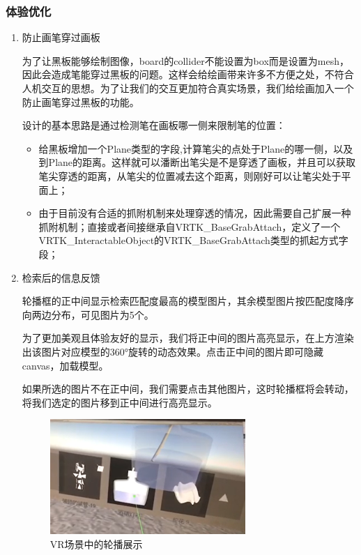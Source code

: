\documentclass{article}
\begin{document}
\subsubsection{体验优化}
\begin{enumerate}
    \item 防止画笔穿过画板
    
    \qquad 为了让黑板能够绘制图像，board的collider不能设置为box而是设置为mesh，因此会造成笔能穿过黑板的问题。这样会给绘画带来许多不方便之处，不符合人机交互的思想。为了让我们的交互更加符合真实场景，我们给绘画加入一个防止画笔穿过黑板的功能。
    
    \qquad 设计的基本思路是通过检测笔在画板哪一侧来限制笔的位置：
    \begin{itemize}
        \item 给黑板增加一个Plane类型的字段,计算笔尖的点处于Plane的哪一侧，以及到Plane的距离。这样就可以潘断出笔尖是不是穿透了画板，并且可以获取笔尖穿透的距离，从笔尖的位置减去这个距离，则刚好可以让笔尖处于平面上；
        \item 由于目前没有合适的抓附机制来处理穿透的情况，因此需要自己扩展一种抓附机制；直接或者间接继承自VRTK\_BaseGrabAttach，定义了一个VRTK\_InteractableObject的VRTK\_BaseGrabAttach类型的抓起方式字段；
    \end{itemize}

    \item 检索后的信息反馈
    
    \qquad 轮播框的正中间显示检索匹配度最高的模型图片，其余模型图片按匹配度降序向两边分布，可见图片为5个。
    
    \qquad 为了更加美观且体验友好的显示，我们将正中间的图片高亮显示，在上方渲染出该图片对应模型的360°旋转的动态效果。点击正中间的图片即可隐藏canvas，加载模型。

    \qquad 如果所选的图片不在正中间，我们需要点击其他图片，这时轮播框将会转动，将我们选定的图片移到正中间进行高亮显示。
    
    \begin{figure}[htb]
        \centering
        \includegraphics[width=0.7\textwidth]{images/VR.png}
        \caption{VR场景中的轮播展示}\label{fig:digit}
    \end{figure} 
    

\end{enumerate}
\end{document}
